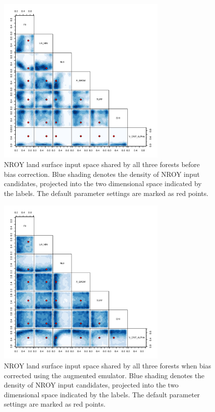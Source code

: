 \documentclass[gmd, manuscript]{copernicus}
\begin{document}
\begin{figure}[t]
\includegraphics[width=8.3cm]{../graphics/best_inputs_all_nobc.pdf}
\caption{NROY land surface input space shared by all three forests before bias correction. Blue shading denotes the density of NROY input candidates, projected into the two dimensional space indicated by the labels. The default parameter settings are marked as red points.
}
\label{fig:best_inputs_all_nobc}
\end{figure}


\begin{figure}[t]
\includegraphics[width=8.3cm]{../graphics/best_inputs_all_bc.pdf}
\caption{NROY land surface input space shared by all three forests when bias corrected using the augmented emulator. Blue shading denotes the density of NROY input candidates, projected into the two dimensional space indicated by the labels. The default parameter settings are marked as red points.
}
\label{fig:best_inputs_all_bc}
\end{figure}
\end{document}
